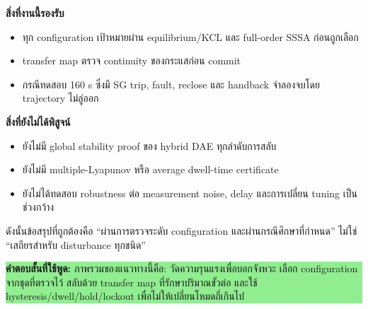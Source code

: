 \documentclass[12pt,a4paper]{article}
\newcommand{\answerbox}[1]{\noindent\colorbox{lightgreen}{\parbox{\dimexpr\textwidth-2\fboxsep\relax}{\textbf{คำตอบสั้นที่ใช้พูด:} #1}}}
\begin{document}
\begin{minipage}[t]{0.475\textwidth}
\textbf{สิ่งที่งานนี้รองรับ}
\begin{itemize}
  \item ทุก configuration เป้าหมายผ่าน equilibrium/KCL และ full-order SSSA ก่อนถูกเลือก
  \item transfer map ตรวจ continuity ของกระแสก่อน commit
  \item กรณีทดสอบ 160 s ซึ่งมี SG trip, fault, reclose และ handback จำลองจบโดย trajectory ไม่ลู่ออก
\end{itemize}
\textbf{สิ่งที่ยังไม่ได้พิสูจน์}
\begin{itemize}
  \item ยังไม่มี global stability proof ของ hybrid DAE ทุกลำดับการสลับ
  \item ยังไม่มี multiple-Lyapunov หรือ average dwell-time certificate
  \item ยังไม่ได้ทดสอบ robustness ต่อ measurement noise, delay และการเปลี่ยน tuning เป็นช่วงกว้าง
\end{itemize}
ดังนั้นข้อสรุปที่ถูกต้องคือ ``ผ่านการตรวจระดับ configuration และผ่านกรณีศึกษาที่กำหนด'' ไม่ใช่ ``เสถียรสำหรับ disturbance ทุกชนิด''
\end{minipage}

\vfill
\answerbox{ภาพรวมของแนวทางนี้คือ: วัดความรุนแรงเพื่อบอกจังหวะ เลือก configuration จากชุดที่ตรวจไว้ สลับด้วย transfer map ที่รักษาปริมาณขั้วต่อ และใช้ hysteresis/dwell/hold/lockout เพื่อไม่ให้เปลี่ยนโหมดถี่เกินไป}
\end{document}
